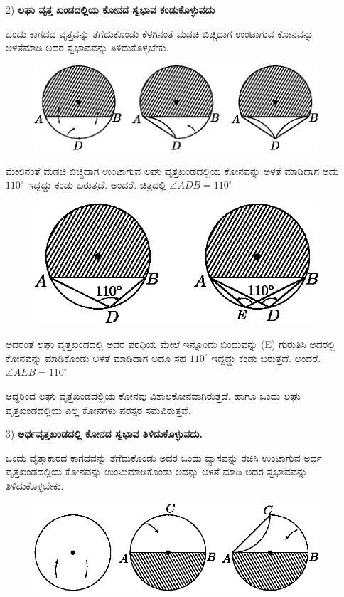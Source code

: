 \begin{itemize}
 \item[2)] \textbf{ಲಘು ವೃತ್ತ ಖಂಡದಲ್ಲಿಯ ಕೋನದ ಸ್ವಭಾವ ಕಂಡುಕೊಳ್ಳುವದು} 
 
 ಒಂದು ಕಾಗದದ ವೃತ್ತವನ್ನು ತೆಗೆದುಕೊಂಡು ಕೆಳಗಿನಂತೆ ಮಡಚಿ ಬಿಚ್ಚಿದಾಗ ಉಂಟಾಗುವ ಕೋನವನ್ನು ಅಳತೆಮಾಡಿ ಅದರ ಸ್ವಭಾವವನ್ನು ತಿಳಿದುಕೊಳ್ಳಬೇಕು. 
 \begin{figure}[H]
\centering
\includegraphics[scale=.98]{src/figure/chap1/fig1-30a.eps}
\end{figure}
 
 ಮೇಲಿನಂತೆ ಮಡಚಿ ಬಿಚ್ಚಿದಾಗ ಉಂಟಾಗುವ ಲಘು ವೃತ್ತಖಂಡದಲ್ಲಿಯ ಕೋನವನ್ನು ಅಳತೆ ಮಾಡಿದಾಗ ಅದು $110^\circ$ ಇದ್ದದ್ದು ಕಂಡು ಬರುತ್ತದೆ. ಅಂದರೆ. ಚಿತ್ರದಲ್ಲಿ  $\angle ADB = 110^\circ$
  \begin{figure}[H]
\centering
\includegraphics[scale=.98]{src/figure/chap1/fig1-30b.eps}
\end{figure}
 
 ಅದರಂತೆ ಲಘು ವೃತ್ತಖಂಡದಲ್ಲಿ ಅದರ ಪರಧಿಯ ಮೇಲೆ ಇನ್ನೊಂದು ಬಿಂದುವನ್ನು (E) ಗುರುತಿಸಿ ಅದರಲ್ಲಿ ಕೋನವನ್ನು ಮಾಡಿಕೊಂಡು ಅಳತೆ ಮಾಡಿದಾಗ ಅದೂ ಸಹ  $110^\circ$ ಇದ್ದದ್ದು ಕಂಡು ಬರುತ್ತದೆ. ಅಂದರೆ.  $\angle AEB = 110^\circ$
 
 ಆದ್ದರಿಂದ ಲಘು ವೃತ್ತಖಂಡದಲ್ಲಿಯ ಕೋನವು ವಿಶಾಲಕೋನವಾಗಿರುತ್ತದೆ. ಹಾಗೂ ಒಂದು ಲಘು ವೃತ್ತಖಂಡದಲ್ಲಿಯ ಎಲ್ಲ ಕೋನಗಳು ಪರಸ್ಪರ ಸಮವಿರುತ್ತವೆ.  
 
  \item[3)] \textbf{ಅರ್ಧವೃತ್ತಖಂಡದಲ್ಲಿ ಕೋನದ ಸ್ವಭಾವ ತಿಳಿದುಕೊಳ್ಳುವದು.}
  
  ಒಂದು ವೃತ್ತಾಕಾರದ ಕಾಗದವನ್ನು  ತೆಗೆದುಕೊಂಡು ಅದರ ಒಂದು ವ್ಯಾಸವನ್ನು ರಚಿಸಿ ಉಂಟಾಗುವ ಅರ್ಧ ವೃತ್ತಖಂಡದಲ್ಲಿಯ ಕೋನವನ್ನು ಉಂಟುಮಾಡಿಕೊಂಡು ಅದನ್ನು ಅಳತೆ ಮಾಡಿ ಅದರ ಸ್ವಭಾವವನ್ನು ತಿಳಿದುಕೊಳ್ಳಬೇಕು. 
\begin{figure}[H]
\centering
\includegraphics[scale=.98]{src/figure/chap1/fig1-31a.eps}
\end{figure}
 

\end{itemize}
